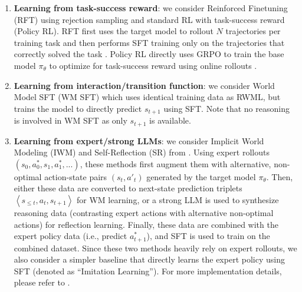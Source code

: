 \documentclass{article}
\theoremstyle{plain}
\theoremstyle{definition}
\theoremstyle{remark}
\newcommand{\ie}{i.e.,}
\newcommand{\distill}[0]{Imitation Learning}
\newcommand{\IWM}[0]{IWM}
\newcommand{\ICRIT}[0]{SR}
\newcommand{\rft}[0]{RFT}
\newcommand{\policyrl}[0]{Policy RL}
\newcommand{\shortmethod}[0]{RWML}
\newcommand{\wmrlshort}[0]{\shortmethod}
\newcommand{\wmsftshort}[0]{WM SFT}
\begin{document}
\begin{enumerate}
  \item \textbf{Learning from task-success reward}: we consider Reinforced Finetuning (\rft{}) using rejection sampling and standard RL with task-success reward (\policyrl{}). \rft{} first uses the target model to rollout $N$ trajectories per training task and then performs SFT training only on the trajectories that correctly solved the task \citep{touvron2023llama2openfoundation,zelikman2022starbootstrappingreasoningreasoning}. \policyrl{} directly uses GRPO to train the base model $\pi_\theta$ to optimize for task-success reward using online rollouts \citep{feng2025groupingrouppolicyoptimizationllm,yu2025dynamindlearningsimulateexperience}.
  \item \textbf{Learning from interaction/transition function}: we consider World Model SFT (\wmsftshort{}) which uses identical training data as \wmrlshort{}, but trains the model to directly predict $s_{t+1}$ using SFT. Note that no reasoning is involved in \wmsftshort{} as only $s_{t+1}$ is available.
  \item \textbf{Learning from expert/strong LLMs}: we consider Implicit World Modeling (\IWM{}) and Self-Reflection (\ICRIT{}) from \citet{zhang2025agentlearningearlyexperience,yu2025dynathinksynergizingreasoningacting}.
  Using expert rollouts $(s_0, a^{*}_0, s_1, a^{*}_1, ...)$, these methods first augment them with alternative, non-optimal action-state pairs $(s_t, a'_t)$ generated by the target model $\pi_\theta$.
  Then, either these data are converted to next-state prediction triplets $\left\langle s_{\le t}, a_t, s_{t+1} \right\rangle$ for WM learning, or a strong LLM is used to synthesize reasoning data (contrasting expert actions with alternative non-optimal actions) for reflection learning.
  Finally, these data are combined with the expert policy data (\ie{} predict $a^{*}_{t+1}$), and SFT is used to train on the combined dataset.
  Since these two methods heavily rely on expert rollouts, we also consider a simpler baseline that directly learns the expert policy using SFT (denoted as ``\distill{}'').
  For more implementation details, please refer to .
\end{enumerate}
\end{document}
